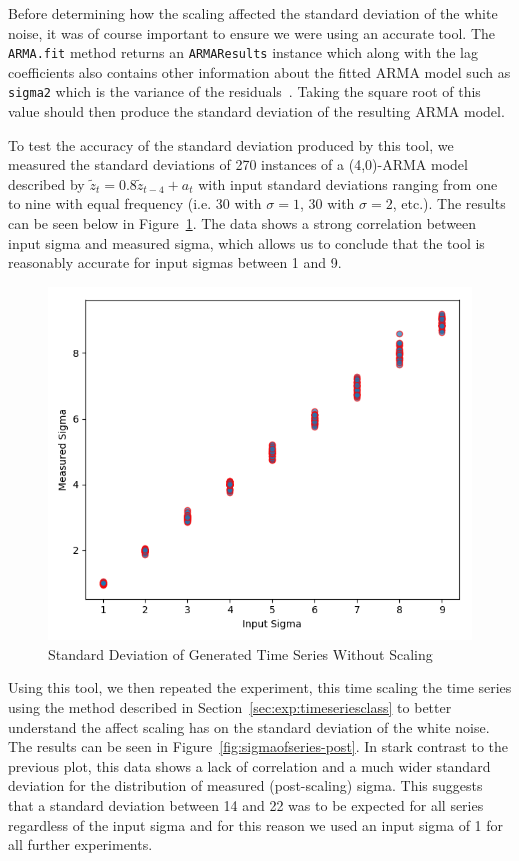 \documentclass[oneside,12pt,openany]{book}
\begin{document}
    Before determining how the scaling affected the standard deviation of the white noise, it was of course important to ensure we were using an accurate tool. The \texttt{ARMA.fit} method returns an \texttt{ARMAResults} instance which along with the lag coefficients also contains other information about the fitted ARMA model such as \texttt{sigma2} which is the variance of the residuals~\cite{statsmodels}. Taking the square root of this value should then produce the standard deviation of the resulting ARMA model.
    
    To test the accuracy of the standard deviation produced by this tool, we measured the standard deviations of 270 instances of a (4,0)-ARMA model described by $\tilde{z}_{t}=0.8\tilde{z}_{t-4}+a_{t}$ with input standard deviations ranging from one to nine with equal frequency (i.e. 30 with $\sigma=1$, 30 with $\sigma=2$, etc.). The results can be seen below in Figure~\ref{fig:sigmaofseries-pre}. The data shows a strong correlation between input sigma and measured sigma, which allows us to conclude that the tool is reasonably accurate for input sigmas between 1 and 9.
    
    \begin{figure}[hbt!]
        \centering
        \includegraphics[width=.8\linewidth]{images/SigmaOfSeries-PreScaling.png}
        \caption{Standard Deviation of Generated Time Series Without Scaling}
        \label{fig:sigmaofseries-pre}
    \end{figure}
    
    Using this tool, we then repeated the experiment, this time scaling the time series using the method described in Section~\ref{sec:exp:timeseriesclass} to better understand the affect scaling has on the standard deviation of the white noise. The results can be seen in Figure~\ref{fig:sigmaofseries-post}. In stark contrast to the previous plot, this data shows a lack of correlation and a much wider standard deviation for the distribution of measured (post-scaling) sigma. This suggests that a standard deviation between 14 and 22 was to be expected for all series regardless of the input sigma and for this reason we used an input sigma of 1 for all further experiments.
    
\end{document}
